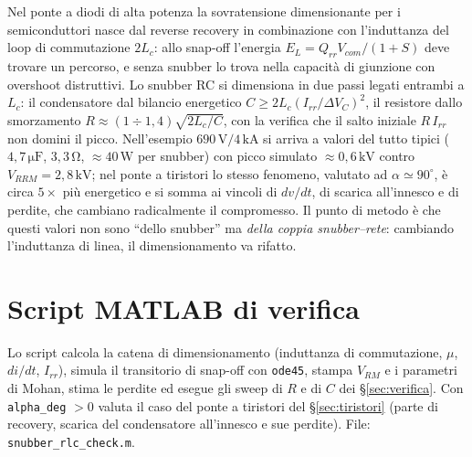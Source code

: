 \documentclass[11pt,a4paper]{article}
\newcommand{\unit}[1]{\,\mathrm{#1}}
\begin{document}
Nel ponte a diodi di alta potenza la sovratensione dimensionante per i
semiconduttori nasce dal reverse recovery in combinazione con
l'induttanza del loop di commutazione $2L_c$: allo snap-off l'energia
$E_L = Q_{rr}V_{com}/(1+S)$ deve trovare un percorso, e senza snubber lo
trova nella capacit\`a di giunzione con overshoot distruttivi. Lo snubber
RC si dimensiona in due passi legati entrambi a $L_c$: il condensatore dal
bilancio energetico $C \ge 2L_c(I_{rr}/\Delta V_C)^2$, il resistore dallo
smorzamento $R \approx (1\div1{,}4)\sqrt{2L_c/C}$, con la verifica che il
salto iniziale $R\,I_{rr}$ non domini il picco. Nell'esempio
$690\unit{V}/4\unit{kA}$ si arriva a valori del tutto tipici
($4{,}7\unit{\mu F}$, $3{,}3\unit{\Omega}$, $\approx40\unit{W}$ per
snubber) con picco simulato $\approx0{,}6\unit{kV}$ contro
$V_{RRM}=2{,}8\unit{kV}$; nel ponte a tiristori lo stesso fenomeno,
valutato ad $\alpha\simeq90^\circ$, \`e circa $5\times$ pi\`u energetico e
si somma ai vincoli di $dv/dt$, di scarica all'innesco e di perdite, che
cambiano radicalmente il compromesso. Il punto di metodo \`e che questi valori non
sono ``dello snubber'' ma \emph{della coppia snubber--rete}: cambiando
l'induttanza di linea, il dimensionamento va rifatto.

\appendix
\section{Script MATLAB di verifica}
\label{app:matlab}

Lo script calcola la catena di dimensionamento (induttanza di
commutazione, $\mu$, $di/dt$, $I_{rr}$), simula il transitorio di
snap-off con \texttt{ode45}, stampa $V_{RM}$ e i parametri di Mohan,
stima le perdite ed esegue gli sweep di $R$ e di $C$ dei
\S\ref{sec:verifica}. Con \texttt{alpha\_deg} $>0$ valuta il caso del
ponte a tiristori del \S\ref{sec:tiristori} (parte di recovery, scarica
del condensatore all'innesco e sue perdite). File:
\texttt{snubber\_rlc\_check.m}.
\end{document}
